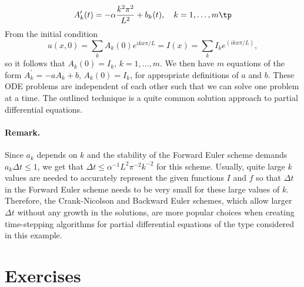 \documentclass[graybox,sectrefs,envcountresetchap,open=right,final]{svmonodo}
\begin{document}
\[
A_k^{\prime}(t) = -\alpha\frac{k^2\pi^2}{L^2} + b_k(t),\quad k=1,\ldots,m
\tp
\]
From the initial condition
\[ u(x,0)=\sum_k A_k(0)e^{ikx\pi/L}=I(x)=\sum_k I_k e^{(ikx\pi/L)},\]
so it follows that $A_k(0)=I_k$, $k=1,\ldots,m$. We then have $m$
equations of the form $A_k^{\prime}=-a A_k +b$, $A_k(0)=I_k$, for
appropriate definitions of $a$ and $b$. These ODE problems
are independent of each other such that we can solve one problem
at a time. The outlined technique is a quite common solution approach to
partial differential equations.

\paragraph{Remark.}
Since $a_k$ depends on $k$ and the stability of the
Forward Euler scheme demands $a_k\Delta t \leq 1$, we get that $\Delta
t \leq \alpha^{-1}L^2\pi^{-2} k^{-2}$ for this scheme.  Usually, quite
large $k$ values are needed to accurately represent the given
functions $I$ and $f$ so that $\Delta t$ in the Forward Euler scheme
needs to be very small for these large values of $k$.  Therefore, the
Crank-Nicolson and Backward Euler schemes, which allow larger $\Delta
t$ without any growth in the solutions, are more popular choices when
creating time-stepping algorithms for partial differential equations
of the type considered in this example.


\section{Exercises}
\end{document}
